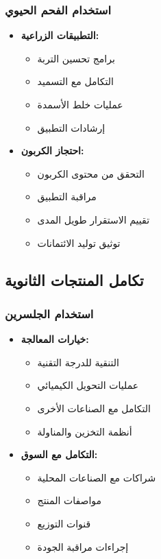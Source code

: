 \subsubsection{استخدام الفحم الحيوي}
\begin{itemize}
    \item \textbf{التطبيقات الزراعية:}
    \begin{itemize}
        \item برامج تحسين التربة
        \item التكامل مع التسميد
        \item عمليات خلط الأسمدة
        \item إرشادات التطبيق
    \end{itemize}
    
    \item \textbf{احتجاز الكربون:}
    \begin{itemize}
        \item التحقق من محتوى الكربون
        \item مراقبة التطبيق
        \item تقييم الاستقرار طويل المدى
        \item توثيق توليد الائتمانات
    \end{itemize}
\end{itemize}

\subsection{تكامل المنتجات الثانوية}

\subsubsection{استخدام الجلسرين}
\begin{itemize}
    \item \textbf{خيارات المعالجة:}
    \begin{itemize}
        \item التنقية للدرجة التقنية
        \item عمليات التحويل الكيميائي
        \item التكامل مع الصناعات الأخرى
        \item أنظمة التخزين والمناولة
    \end{itemize}
    
    \item \textbf{التكامل مع السوق:}
    \begin{itemize}
        \item شراكات مع الصناعات المحلية
        \item مواصفات المنتج
        \item قنوات التوزيع
        \item إجراءات مراقبة الجودة
    \end{itemize}
\end{itemize}

